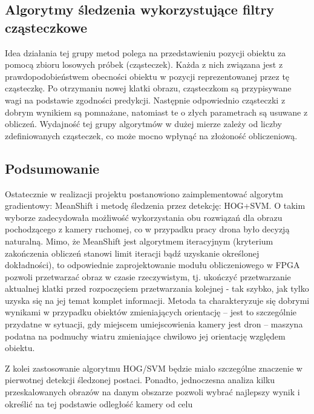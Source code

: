 \subsection{Algorytmy śledzenia wykorzystujące filtry cząsteczkowe}
Idea działania tej grupy metod polega na przedstawieniu pozycji obiektu za pomocą zbioru losowych próbek (cząsteczek). Każda z nich związana jest z prawdopodobieństwem obecności obiektu w pozycji reprezentowanej przez tę cząsteczkę. Po otrzymaniu nowej klatki obrazu, cząsteczkom są przypisywane wagi na podstawie zgodności predykcji. Następnie odpowiednio cząsteczki z dobrym wynikiem są pomnażane, natomiast te o złych parametrach są usuwane z obliczeń.
Wydajność tej grupy algorytmów w dużej mierze zależy od liczby zdefiniowanych cząsteczek, co może mocno wpłynąć na złożoność obliczeniową.
\subsection{Podsumowanie}

Ostatecznie w realizacji projektu postanowiono zaimplementować algorytm gradientowy: MeanShift i metodę śledzenia przez detekcję: HOG+SVM. %
O takim wyborze zadecydowała możliwość wykorzystania obu rozwiązań dla obrazu pochodzącego z kamery ruchomej, co w przypadku pracy drona było decyzją naturalną. %
Mimo, że MeanShift jest algorytmem iteracyjnym (kryterium zakończenia obliczeń stanowi limit iteracji bądź uzyskanie określonej dokładności), to odpowiednie zaprojektowanie modułu obliczeniowego w FPGA pozwoli przetwarzać obraz w czasie rzeczywistym, tj. ukończyć przetwarzanie aktualnej klatki przed rozpoczęciem przetwarzania kolejnej - tak szybko, jak tylko uzyska się na jej temat komplet informacji. %
Metoda ta charakteryzuje się dobrymi wynikami w przypadku obiektów zmieniających orientację -- jest to szczególnie przydatne w sytuacji, gdy miejscem umiejscowienia kamery jest dron -- maszyna podatna na podmuchy wiatru zmieniające chwilowo jej orientację względem obiektu. 

Z kolei zastosowanie algorytmu HOG/SVM będzie miało szczególne znaczenie w pierwotnej detekcji śledzonej postaci. Ponadto, jednoczesna analiza kilku przeskalowanych obrazów na danym obszarze pozwoli wybrać najlepszy wynik i określić na tej podstawie odległość kamery od celu  %

